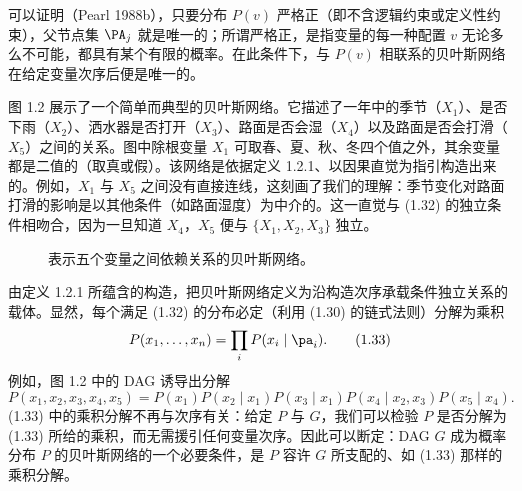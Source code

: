 可以证明（Pearl 1988b），只要分布 $P(v)$ 严格正（即不含逻辑约束或定义性约束），父节点集 $\PA_j$ 就是唯一的；所谓严格正，是指变量的每一种配置 $v$ 无论多么不可能，都具有某个有限的概率。在此条件下，与 $P(v)$ 相联系的贝叶斯网络在给定变量次序后便是唯一的。

图 1.2 展示了一个简单而典型的贝叶斯网络。它描述了一年中的季节（$X_1$）、是否下雨（$X_2$）、洒水器是否打开（$X_3$）、路面是否会湿（$X_4$）以及路面是否会打滑（$X_5$）之间的关系。图中除根变量 $X_1$ 可取春、夏、秋、冬四个值之外，其余变量都是二值的（取真或假）。该网络是依据定义 1.2.1、以因果直觉为指引构造出来的。例如，$X_1$ 与 $X_5$ 之间没有直接连线，这刻画了我们的理解：季节变化对路面打滑的影响是以其他条件（如路面湿度）为中介的。这一直觉与 \textup{(1.32)} 的独立条件相吻合，因为一旦知道 $X_4$，$X_5$ 便与 $\{X_1,X_2,X_3\}$ 独立。

\begin{figure}[htbp]
\centering
{}
\caption{表示五个变量之间依赖关系的贝叶斯网络。}
\label{fig:1.2}
\end{figure}

由定义 1.2.1 所蕴含的构造，把贝叶斯网络定义为沿构造次序承载条件独立关系的载体。显然，每个满足 \textup{(1.32)} 的分布必定（利用 \textup{(1.30)} 的链式法则）分解为乘积
\begin{equation}
P(x_1,\dots,x_n) = \prod_{i} P(x_i \mid \pa_i). \tag{1.33}
\end{equation}
例如，图 1.2 中的 DAG 诱导出分解
\begin{equation}
P(x_1,x_2,x_3,x_4,x_5) = P(x_1)P(x_2\mid x_1)P(x_3\mid x_1)P(x_4\mid x_2,x_3)P(x_5\mid x_4). \tag{1.34}
\end{equation}
\textup{(1.33)} 中的乘积分解不再与次序有关：给定 $P$ 与 $G$，我们可以检验 $P$ 是否分解为 \textup{(1.33)} 所给的乘积，而无需援引任何变量次序。因此可以断定：DAG $G$ 成为概率分布 $P$ 的贝叶斯网络的一个必要条件，是 $P$ 容许 $G$ 所支配的、如 \textup{(1.33)} 那样的乘积分解。

